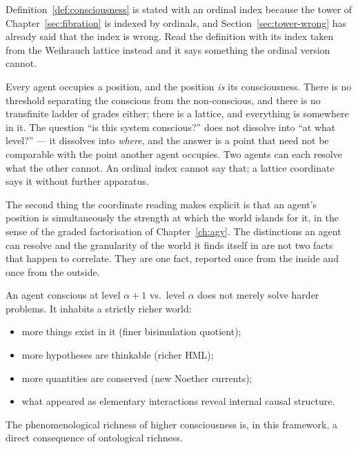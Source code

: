 \begin{remark}
\label{rmk:coordinate}
Definition~\ref{def:consciousness} is stated with an ordinal index
because the tower of Chapter~\ref{sec:fibration} is indexed by
ordinals, and Section~\ref{sec:tower-wrong} has already said that the
index is wrong.
Read the definition with its index taken from the Weihrauch lattice
instead and it says something the ordinal version cannot.

Every agent occupies a position, and the position \emph{is} its
consciousness.
There is no threshold separating the conscious from the
non-conscious, and there is no transfinite ladder of grades either;
there is a lattice, and everything is somewhere in it.
The question ``is this system conscious?'' does not dissolve into
``at what level?'' --- it dissolves into \emph{where}, and the answer
is a point that need not be comparable with the point another agent
occupies.
Two agents can each resolve what the other cannot.
An ordinal index cannot say that; a lattice coordinate says it
without further apparatus.

The second thing the coordinate reading makes explicit is that an
agent's position is simultaneously the strength at which the world
islands for it, in the sense of the graded factorisation of
Chapter~\ref{ch:agy}.
The distinctions an agent can resolve and the granularity of the
world it finds itself in are not two facts that happen to correlate.
They are one fact, reported once from the inside and once from the
outside.
\end{remark}

\begin{remark}
An agent conscious at level $\alpha+1$ vs.\ level $\alpha$ does
not merely solve harder problems.
It inhabits a strictly richer world:
\begin{itemize}[itemsep=2pt]
  \item more things exist in it (finer bisimulation quotient);
  \item more hypotheses are thinkable (richer HML);
  \item more quantities are conserved (new Noether currents);
  \item what appeared as elementary interactions reveal internal
        causal structure.
\end{itemize}
The phenomenological richness of higher consciousness is, in this
framework, a direct consequence of ontological richness.
\end{remark}

